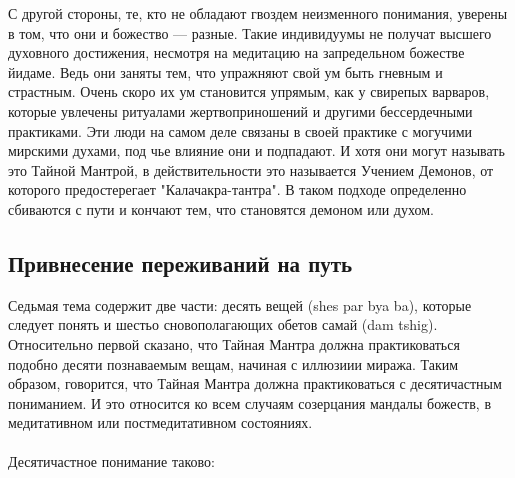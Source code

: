 \begin{siderules}
С другой стороны, те, кто не обладают гвоздем неизменного понимания, уверены в том, что
они и божество — разные. Такие индивидуумы не получат высшего духовного достижения,
несмотря на медитацию на запредельном божестве йидаме. Ведь они заняты тем, что
упражняют свой ум быть гневным и страстным. Очень скоро их ум становится упрямым, как
у свирепых варваров, которые увлечены ритуалами жертвоприношений и другими
бессердечными практиками. Эти люди на самом деле связаны в своей практике с могучими
мирскими духами, под чье влияние они и подпадают. И хотя они могут называть это Тайной
Мантрой, в действительности это называется Учением Демонов, от которого предостерегает
"Калачакра-тантра". В таком подходе определенно сбиваются с пути и кончают тем, что
становятся демоном или духом.
\end{siderules}

\subsection{Привнесение переживаний на путь}

Седьмая тема содержит две части: десять вещей (shes par bya ba), которые следует
понять и шестьо сновополагающих обетов самай (dam tshig). Относительно первой сказано,
что Тайная Мантра должна практиковаться подобно десяти познаваемым вещам, начиная с
иллюзиии миража. Таким образом, говорится, что Тайная Мантра должна практиковаться с
десятичастным пониманием. И это относится ко всем случаям созерцания мандалы божеств,
в медитативном или постмедитативном состояниях.\\
\\
Десятичастное понимание таково:

